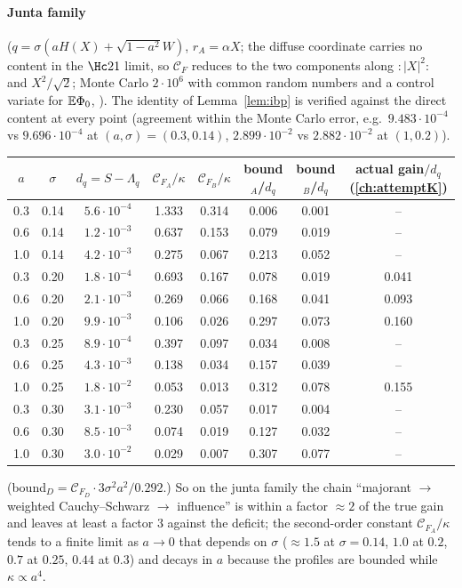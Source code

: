 \paragraph{Junta family} ($q=\sigma(aH(X)+\sqrt{1-a^2}W)$, $r_A=\alpha X$; the diffuse coordinate carries no content in the $\Hc21$ limit, so $\mathcal C_F$ reduces to the two components
along ${:}|X|^2{:}$ and $X^2/\sqrt2$; Monte Carlo $2\cdot10^6$ with common random numbers and a control variate for $\mathbb E\Phi_0$, ). The identity of Lemma~\ref{lem:ibp} is
verified against the direct content at every point (agreement within the Monte Carlo error, e.g.\ $9.483\cdot10^{-4}$ vs $9.696\cdot10^{-4}$ at $(a,\sigma)=(0.3,0.14)$, $2.899\cdot10^{-2}$ vs
$2.882\cdot10^{-2}$ at $(1,0.2)$).
\begin{center}\small
\begin{tabular}{cc|ccc|ccc}\toprule
$a$ & $\sigma$ & $d_q=S-\Lambda_q$ & $\mathcal C_{F_A}/\kappa$ & $\mathcal C_{F_B}/\kappa$ & bound$_A$/$d_q$ & bound$_B$/$d_q$ & actual gain$/d_q$ (\autoref{ch:attemptK})\\\midrule
0.3 & 0.14 & $5.6\cdot10^{-4}$ & 1.333 & 0.314 & 0.006 & 0.001 & --\\
0.6 & 0.14 & $1.2\cdot10^{-3}$ & 0.637 & 0.153 & 0.079 & 0.019 & --\\
1.0 & 0.14 & $4.2\cdot10^{-3}$ & 0.275 & 0.067 & 0.213 & 0.052 & --\\
0.3 & 0.20 & $1.8\cdot10^{-4}$ & 0.693 & 0.167 & 0.078 & 0.019 & 0.041\\
0.6 & 0.20 & $2.1\cdot10^{-3}$ & 0.269 & 0.066 & 0.168 & 0.041 & 0.093\\
1.0 & 0.20 & $9.9\cdot10^{-3}$ & 0.106 & 0.026 & 0.297 & 0.073 & 0.160\\
0.3 & 0.25 & $8.9\cdot10^{-4}$ & 0.397 & 0.097 & 0.034 & 0.008 & --\\
0.6 & 0.25 & $4.3\cdot10^{-3}$ & 0.138 & 0.034 & 0.157 & 0.039 & --\\
1.0 & 0.25 & $1.8\cdot10^{-2}$ & 0.053 & 0.013 & 0.312 & 0.078 & 0.155\\
0.3 & 0.30 & $3.1\cdot10^{-3}$ & 0.230 & 0.057 & 0.017 & 0.004 & --\\
0.6 & 0.30 & $8.5\cdot10^{-3}$ & 0.074 & 0.019 & 0.127 & 0.032 & --\\
1.0 & 0.30 & $3.0\cdot10^{-2}$ & 0.029 & 0.007 & 0.307 & 0.077 & --\\
\bottomrule
\end{tabular}
\end{center}
(bound$_D=\mathcal C_{F_D}\cdot3\sigma^2a^2/0.292$.) So on the junta family the chain
``majorant $\to$ weighted Cauchy--Schwarz $\to$ influence'' is within a factor $\approx2$ of the true gain and leaves at least a factor $3$ against the deficit; the
second-order constant $\mathcal C_{F_A}/\kappa$ tends to a finite limit as $a\to0$ that depends on $\sigma$ ($\approx1.5$ at $\sigma=0.14$, $1.0$ at $0.2$, $0.7$ at $0.25$, $0.44$ at $0.3$) and decays
in $a$ because the profiles are bounded while $\kappa\propto a^4$.
